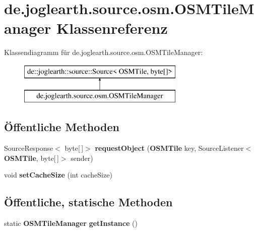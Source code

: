\section{de.\-joglearth.\-source.\-osm.\-O\-S\-M\-Tile\-Manager Klassenreferenz}
\label{classde_1_1joglearth_1_1source_1_1osm_1_1_o_s_m_tile_manager}
Klassendiagramm für de.\-joglearth.\-source.\-osm.\-O\-S\-M\-Tile\-Manager\-:\begin{figure}[H]
\begin{center}
\leavevmode
\includegraphics[height=2.000000cm]{classde_1_1joglearth_1_1source_1_1osm_1_1_o_s_m_tile_manager}
\end{center}
\end{figure}
\subsection*{Öffentliche Methoden}
\begin{DoxyCompactItemize}
\item 
Source\-Response$<$ byte[$\,$]$>$ {\bfseries request\-Object} ({\bf O\-S\-M\-Tile} key, Source\-Listener$<$ {\bf O\-S\-M\-Tile}, byte[$\,$]$>$ sender)\label{classde_1_1joglearth_1_1source_1_1osm_1_1_o_s_m_tile_manager_acb86a61ab9d3572ed510b45bada76a26}

\item 
void {\bfseries set\-Cache\-Size} (int cache\-Size)\label{classde_1_1joglearth_1_1source_1_1osm_1_1_o_s_m_tile_manager_aae8e7bab613b9504c1de76626ac87f8b}

\end{DoxyCompactItemize}
\subsection*{Öffentliche, statische Methoden}
\begin{DoxyCompactItemize}
\item 
static {\bf O\-S\-M\-Tile\-Manager} {\bfseries get\-Instance} ()\label{classde_1_1joglearth_1_1source_1_1osm_1_1_o_s_m_tile_manager_a132bf30ed8003964deda8bb2214acc27}

\end{DoxyCompactItemize}
